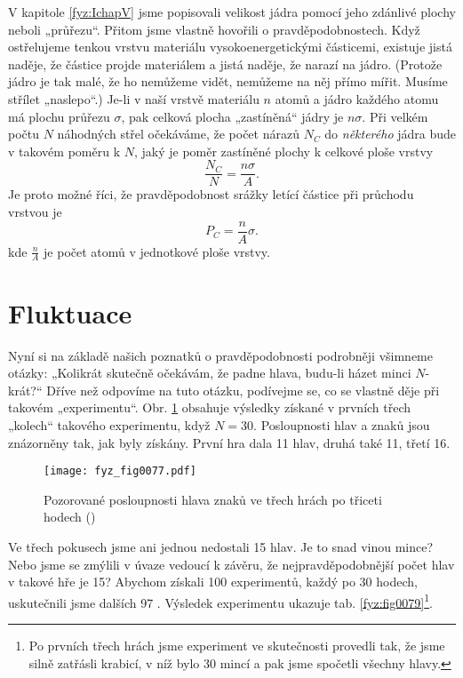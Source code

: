     V kapitole \ref{fyz:IchapV} jsme popisovali velikost jádra pomocí jeho zdánlivé plochy neboli 
    „průřezu“. Přitom jsme vlastně hovořili o pravděpodobnostech. Když ostřelujeme tenkou vrstvu 
    materiálu vysokoenergetickými částicemi, existuje jistá naděje, že částice projde materiálem a 
    jistá naděje, že narazí na jádro. (Protože jádro je tak malé, že ho nemůžeme vidět, nemůžeme na 
    něj přímo mířit. Musíme střílet „naslepo“.) Je-li v naší vrstvě materiálu \(n\) atomů a jádro 
    každého atomu má plochu průřezu \(\sigma\), pak celková plocha „zastíněná“ jádry je 
    \(n\sigma\). Při velkém počtu \(N\) náhodných střel očekáváme, že počet nárazů \(N_C\) do 
    \emph{některého} jádra bude v takovém poměru k \(N\), jaký je poměr zastíněné plochy k celkové 
    ploše vrstvy
    \begin{equation}\label{fyz:eq072}
      \frac{N_C}{N} = \frac{n\sigma}{A}.
    \end{equation}
    Je proto možné říci, že pravděpodobnost srážky letící částice při průchodu vrstvou je
    \begin{equation}\label{fyz:eq073}
      P_C = \frac{n}{A}\sigma.
    \end{equation}
    kde \(\frac{n}{A}\) je počet atomů v jednotkové ploše vrstvy.
    
  \section{Fluktuace}
    Nyní si na základě našich poznatků o pravděpodobnosti podrobněji všimneme otázky: „Kolikrát 
    skutečně očekávám, že padne hlava, budu-li házet minci \(N\)- krát?“ Dříve než odpovíme na tuto 
    otázku, podívejme se, co se vlastně děje při takovém „experimentu“. Obr. \ref{fyz:fig0077} 
    obsahuje výsledky získané v prvních třech „kolech“ takového experimentu, když \(N= 30\). 
    Posloupnosti hlav a znaků jsou znázorněny tak, jak byly získány. První hra dala \num{11} hlav, 
    druhá také \num{11}, třetí \num{16}.
    
    \begin{figure}[ht!]  %
      \centering
      \texttt{[image: fyz\_fig0077.pdf]}
      \caption{Pozorované posloupnosti hlava znaků ve třech hrách po třiceti hodech 
              (\cite[s.~79]{Feynman01})}
      \label{fyz:fig0077}
    \end{figure}
    Ve třech pokusech jsme ani jednou nedostali \num{15} hlav. Je to snad vinou mince? Nebo jsme se 
    zmýlili v úvaze vedoucí k závěru, že nejpravděpodobnější počet hlav v takové hře je \num{15}? 
    Abychom získali \num{100} experimentů, každý po \num{30} hodech, uskutečnili jsme dalších 
    \num{97} . Výsledek experimentu ukazuje tab. \ref{fyz:fig0079}\footnote{Po prvních třech 
    hrách jsme experiment ve skutečnosti provedli tak, že jsme silně zatřásli krabicí, v níž bylo 
    \num{30} mincí a pak jsme spočetli všechny hlavy.}.
    
